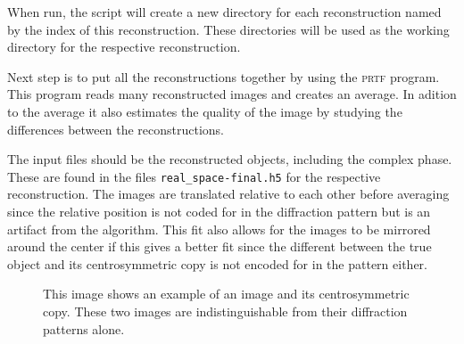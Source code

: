 \documentclass[11pt,a4paper]{article}
\newcommand{\hawk}[1]{\textsc{#1}}
\newcommand{\com}[1]{\texttt{#1}}
\begin{document}
When run, the script will create a new directory for each reconstruction named by the index of this reconstruction. These directories will be used as the working directory for the respective reconstruction. 

Next step is to put all the reconstructions together by using the \hawk{prtf} program. This program reads many reconstructed images and creates an average. In adition to the average it also estimates the quality of the image by studying the differences between the reconstructions.

The input files should be the reconstructed objects, including the complex phase. These are found in the files \com{real\_space-final.h5} for the respective reconstruction. The images are translated relative to each other before averaging since the relative position is not coded for in the diffraction pattern but is an artifact from the algorithm. This fit also allows for the images to be mirrored around the center if this gives a better fit since the different between the true object and its centrosymmetric copy is not encoded for in the pattern either.

\begin{figure}
  \centering
  \caption{This image shows an example of an image and its centrosymmetric copy. These two images are indistinguishable from their diffraction patterns alone.}
  \label{fig:cent}
\end{figure}
\end{document}
